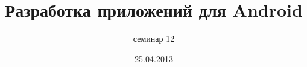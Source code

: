 \documentclass[hyperref={unicode,colorlinks=true,urlbordercolor=blue,linkcolor=blue,urlcolor=blue,pdfborderstyle={/S/U/W 1}}]{beamer}
\title{Разработка приложений для Android}
\subtitle{семинар 12}
\date{25.04.2013}
\begin{document}
\frame{\titlepage}


\end{document}
